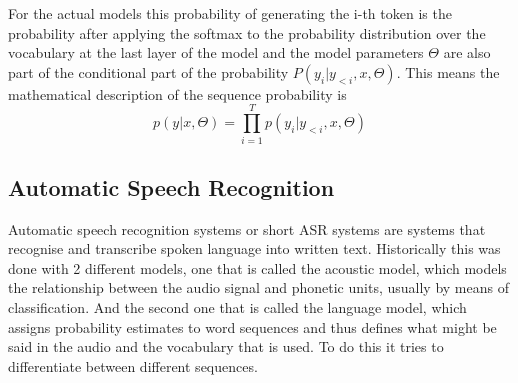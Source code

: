 For the actual models this probability of generating the i-th token is the probability after applying the softmax to the probability distribution over the vocabulary at the last layer of the model and the model parameters $\Theta$ are also part of the conditional part of the probability $P(y_i|y_{<i}, x, \Theta)$. This means the mathematical description of the sequence probability is $$p(y|x,\Theta)=\prod_{i=1}^T p(y_i|y_{<i}, x, \Theta) $$

\subsection{Automatic Speech Recognition}
Automatic speech recognition systems or short ASR systems are systems that recognise and transcribe spoken language into written text.
Historically this was done with 2 different models, one that is called the acoustic model, which models the relationship between the audio signal and phonetic units, usually by means of classification. 
And the second one that is called the language model, which assigns probability estimates to word sequences and thus defines what might be said in the audio and the vocabulary that is used.  
To do this it tries to differentiate between different sequences. \cite{understandingasr}

